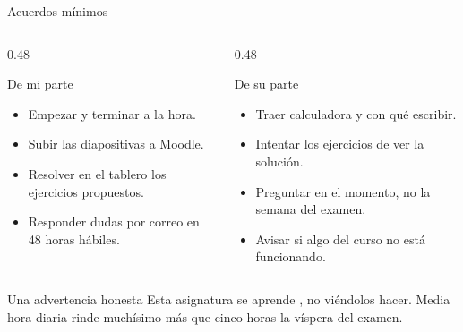 \documentclass[aspectratio=169,10pt]{beamer}
\begin{document}
\begin{frame}{Acuerdos mínimos}
  \scriptsize
  \begin{columns}[T,onlytextwidth]
    \begin{column}{0.48\textwidth}
      \begin{block}{De mi parte}
        \tiny
        \begin{itemize}\setlength{\itemsep}{0.02cm}
          \item Empezar y terminar a la hora.
          \item Subir las diapositivas a Moodle.
          \item Resolver en el tablero los ejercicios propuestos.
          \item Responder dudas por correo en 48 horas hábiles.
        \end{itemize}
      \end{block}
    \end{column}
    \begin{column}{0.48\textwidth}
      \begin{block}{De su parte}
        \tiny
        \begin{itemize}\setlength{\itemsep}{0.02cm}
          \item Traer calculadora y con qué escribir.
          \item Intentar los ejercicios  de ver la solución.
          \item Preguntar en el momento, no la semana del examen.
          \item Avisar si algo del curso no está funcionando.
        \end{itemize}
      \end{block}
    \end{column}
  \end{columns}

  \vspace{0.12cm}
  \begin{alertblock}{Una advertencia honesta}
    \tiny
    Esta asignatura se aprende , no viéndolos
    hacer. Media hora diaria rinde muchísimo más que cinco horas la víspera del
    examen. 
  \end{alertblock}
\end{frame}

\end{document}
